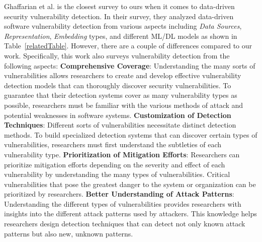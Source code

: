 

Ghaffarian et al. \cite{ghaffarian2017software} is the closest survey to ours when it comes to data-driven security vulnerability detection. %
{In their survey, they analyzed data-driven software vulnerability detection from various aspects including \textit{Data Sources}, \textit{Representation}, \textit{Embedding} types, and different ML/DL models as shown in Table~\ref{relatedTable}}. However, there are a couple of differences compared to our work. %
Specifically, this work also surveys vulnerability detection from the following aspects: \textbf{Comprehensive Coverage}: Understanding the many sorts of vulnerabilities allows researchers to create and develop effective vulnerability detection models that can thoroughly discover security vulnerabilities. To guarantee that their detection systems cover as many vulnerability types as possible, researchers must be familiar with the various methods of attack and potential weaknesses in software systems. \textbf{Customization of Detection Techniques}: Different sorts of vulnerabilities necessitate distinct detection methods. To build specialized detection systems that can discover certain types of vulnerabilities, researchers must first understand the subtleties of each vulnerability type. \textbf{Prioritization of Mitigation Efforts}: Researchers can prioritize mitigation efforts depending on the severity and effect of each vulnerability by understanding the many types of vulnerabilities. Critical vulnerabilities that pose the greatest danger to the system or organization can be prioritized by researchers. \textbf{Better Understanding of Attack Patterns}: Understanding the different types of vulnerabilities provides researchers with insights into the different attack patterns used by attackers. This knowledge helps researchers design detection techniques that can detect not only known attack patterns but also new, unknown patterns. 
